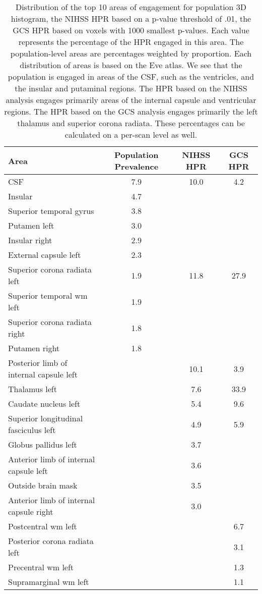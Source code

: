 \begin{table}[ht]
\centering
\begin{tabular}{lccc}
  \hline
Area & Population Prevalence & NIHSS HPR & GCS HPR \\ 
  \hline
CSF & 7.9 & 10.0 & 4.2 \\ 
  Insular & 4.7 &  &  \\ 
  Superior temporal gyrus & 3.8 &  &  \\ 
  Putamen left & 3.0 &  &  \\ 
  Insular right & 2.9 &  &  \\ 
  External capsule left & 2.3 &  &  \\ 
  Superior corona radiata left & 1.9 & 11.8 & 27.9 \\ 
  Superior temporal wm left & 1.9 &  &  \\ 
  Superior corona radiata right & 1.8 &  &  \\ 
  Putamen right & 1.8 &  &  \\ 
  Posterior limb of internal capsule left &  & 10.1 & 3.9 \\ 
  Thalamus left &  & 7.6 & 33.9 \\ 
  Caudate nucleus left &  & 5.4 & 9.6 \\ 
  Superior longitudinal fasciculus left &  & 4.9 & 5.9 \\ 
  Globus pallidus left &  & 3.7 &  \\ 
  Anterior limb of internal capsule left &  & 3.6 &  \\ 
  Outside brain mask &  & 3.5 &  \\ 
  Anterior limb of internal capsule right &  & 3.0 &  \\ 
  Postcentral wm left &  &  & 6.7 \\ 
  Posterior corona radiata left &  &  & 3.1 \\ 
  Precentral wm left &  &  & 1.3 \\ 
  Supramarginal wm left &  &  & 1.1 \\ 
   \hline
\end{tabular}
\caption{Distribution of the top 10 areas of engagement for population  3D histogram, the NIHSS HPR based on a p-value  threshold of .01, the GCS HPR based on voxels with 1000 smallest p-values.  Each value represents the percentage of the HPR engaged in this area.  The population-level areas are percentages weighted by proportion. Each distribution  of areas is based on the Eve atlas.  We see that the population is engaged in areas of the CSF, such as the ventricles, and  the insular and putaminal regions. The HPR based on the NIHSS analysis engages primarily areas of the internal capsule and ventricular regions. The HPR based on the GCS analysis engages primarily the left thalamus and superior corona radiata. These percentages   can be calculated on a per-scan level as well.} 
\label{t:breakdown}
\end{table}
